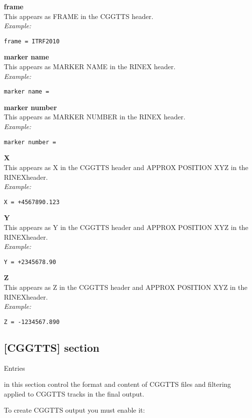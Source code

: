 {\bfseries frame}\\
This appears as FRAME in the CGGTTS header.\\
\textit{Example:}
\begin{lstlisting}
frame = ITRF2010
\end{lstlisting}

{\bfseries marker name}\\
This appears as MARKER NAME in the RINEX header.\\
\textit{Example:}
\begin{lstlisting}
marker name =
\end{lstlisting}

{\bfseries marker number}\\
This appears as MARKER NUMBER in the RINEX header.\\
\textit{Example:}
\begin{lstlisting}
marker number =
\end{lstlisting}

{\bfseries X}\\
This appears as X in the CGGTTS header and APPROX POSITION XYZ in the RINEXheader.\\
\textit{Example:}
\begin{lstlisting}
X = +4567890.123
\end{lstlisting}

{\bfseries Y}\\
This appears as Y in the CGGTTS header and APPROX POSITION XYZ in the RINEXheader.\\
\textit{Example:}
\begin{lstlisting}
Y = +2345678.90
\end{lstlisting}

{\bfseries Z}\\
This appears as Z in the CGGTTS header and APPROX POSITION XYZ in the RINEXheader.\\
\textit{Example:}
\begin{lstlisting}
Z = -1234567.890 
\end{lstlisting}


\subsection{[CGGTTS] section }

\hypertarget{h:cggtts}{Entries} in this section control the format and content of CGGTTS files 
and filtering applied to CGGTTS tracks in the final output.

To create CGGTTS output you must enable it: 


